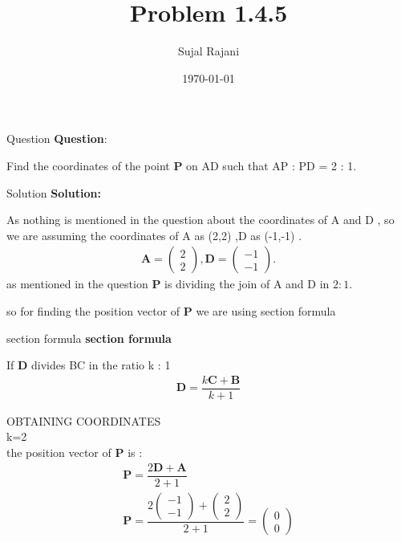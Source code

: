 \documentclass{beamer}
\title{Problem 1.4.5}
\author{Sujal Rajani}
\date{\today}
\let\vec\mathbf
\newcommand{\myvec}[1]{\ensuremath{\begin{pmatrix}#1\end{pmatrix}}}
\theoremstyle{remark}
\numberwithin{equation}{section}
\begin{document}
\begin{frame}
\titlepage
\end{frame}



\begin{frame}{Question}
\textbf{Question}:


\noindent Find the coordinates of the point $\vec{P}$ on AD such that AP : PD = 2 : 1.    
\end{frame}

\begin{frame}{Solution}
\textbf{Solution:} 

As nothing is mentioned in the question about the coordinates of A and D , so we are assuming the coordinates of A as (2,2) ,D as (-1,-1) .
\begin{align}
			\vec A = \myvec{2\\2},\vec D = \myvec{-1\\-1}.
\end{align}
as mentioned in the question $\vec{P}$ is dividing the join of A and D in $2:1$.

so for finding the position vector of $\vec{P}$ we are using section formula 
\end{frame} 

\begin{frame}{section formula }
    \textbf{section formula }

If $\vec{D}$ divides BC in the ratio k : 1
\begin{align*}
     \vec{D}=\dfrac{k\vec{C}+\vec{B}}{k+1}
\end{align*}

\end{frame}
\begin{frame}{OBTAINING COORDINATES}
\\
\quad k=2
\\

    the position vector of $\vec{P}$ is : 
\begin{align*}
     \vec{P}=\dfrac{2\vec{D}+\vec{A}}{2+1}
     \\
     \vec{P}=\dfrac{2\myvec{-1\\-1}+\myvec{2\\2}}{2+1}=\myvec{0\\0}
\end{align*}

\end{frame}
\end{document}
